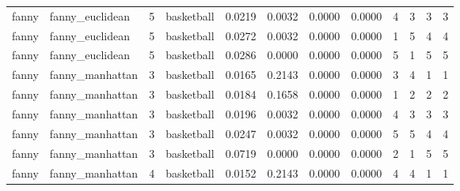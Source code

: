 \documentclass[
]{article}
\begin{document}
\begin{longtable}{| p{1.1cm} | p{2cm} | p{0.8cm} | p{1.3cm} | p{0.60cm} | p{0.7cm} | p{0.65cm} | p{0.65cm} | p{0.65cm} | p{0.65cm} | p{0.7cm} | p{0.65cm} |}
\scriptsize   fanny   & \scriptsize  fanny\_euclidean & \scriptsize    5    & \scriptsize basketball & \scriptsize    0.0219  &  \scriptsize 0.0032 & \scriptsize 0.0000 & \scriptsize    0.0000 & \scriptsize   4  & \scriptsize    3  & \scriptsize    3  & \scriptsize    3 \\
\scriptsize   fanny   & \scriptsize  fanny\_euclidean & \scriptsize    5    & \scriptsize basketball & \scriptsize    0.0272  &  \scriptsize 0.0032 & \scriptsize 0.0000 & \scriptsize    0.0000 & \scriptsize   1  & \scriptsize    5  & \scriptsize    4  & \scriptsize    4 \\
\scriptsize   fanny   & \scriptsize  fanny\_euclidean & \scriptsize    5    & \scriptsize basketball & \scriptsize    0.0286  &  \scriptsize 0.0000 & \scriptsize 0.0000 & \scriptsize    0.0000 & \scriptsize   5  & \scriptsize    1  & \scriptsize    5  & \scriptsize    5 \\
\cline{2-12}
\scriptsize   fanny   & \scriptsize  fanny\_manhattan & \scriptsize    3    & \scriptsize basketball & \scriptsize    0.0165  &  \scriptsize 0.2143 & \scriptsize 0.0000 & \scriptsize    0.0000 & \scriptsize   3  & \scriptsize    4  & \scriptsize    1  & \scriptsize    1 \\
\scriptsize   fanny   & \scriptsize  fanny\_manhattan & \scriptsize    3    & \scriptsize basketball & \scriptsize    0.0184  &  \scriptsize 0.1658 & \scriptsize 0.0000 & \scriptsize    0.0000 & \scriptsize   1  & \scriptsize    2  & \scriptsize    2  & \scriptsize    2 \\
\scriptsize   fanny   & \scriptsize  fanny\_manhattan & \scriptsize    3    & \scriptsize basketball & \scriptsize    0.0196  &  \scriptsize 0.0032 & \scriptsize 0.0000 & \scriptsize    0.0000 & \scriptsize   4  & \scriptsize    3  & \scriptsize    3  & \scriptsize    3 \\
\scriptsize   fanny   & \scriptsize  fanny\_manhattan & \scriptsize    3    & \scriptsize basketball & \scriptsize    0.0247  &  \scriptsize 0.0032 & \scriptsize 0.0000 & \scriptsize    0.0000 & \scriptsize   5  & \scriptsize    5  & \scriptsize    4  & \scriptsize    4 \\
\scriptsize   fanny   & \scriptsize  fanny\_manhattan & \scriptsize    3    & \scriptsize basketball & \scriptsize    0.0719  &  \scriptsize 0.0000 & \scriptsize 0.0000 & \scriptsize    0.0000 & \scriptsize   2  & \scriptsize    1  & \scriptsize    5  & \scriptsize    5 \\
\cline{3-12}
\scriptsize   fanny   & \scriptsize  fanny\_manhattan & \scriptsize    4    & \scriptsize basketball & \scriptsize    0.0152  &  \scriptsize 0.2143 & \scriptsize 0.0000 & \scriptsize    0.0000 & \scriptsize   4  & \scriptsize    4  & \scriptsize    1  & \scriptsize    1 \\

\end{longtable}
\end{document}
